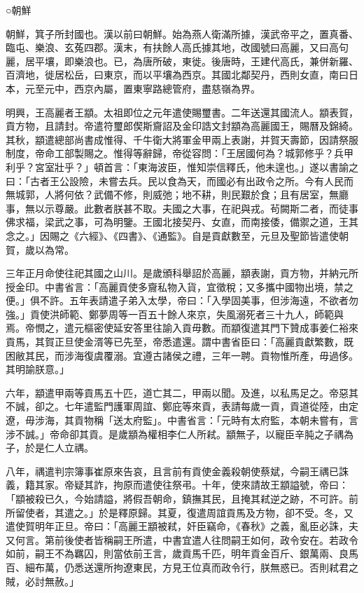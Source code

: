 
\begin{pinyinscope}
○朝鮮

朝鮮，箕子所封國也。漢以前曰朝鮮。始為燕人衛滿所據，漢武帝平之，置真番、臨屯、樂浪、玄菟四郡。漢末，有扶餘人高氏據其地，改國號曰高麗，又曰高句麗，居平壤，即樂浪也。已，為唐所破，東徙。後唐時，王建代高氏，兼併新羅、百濟地，徙居松岳，曰東京，而以平壤為西京。其國北鄰契丹，西則女直，南曰日本，元至元中，西京內屬，置東寧路總管府，盡慈嶺為界。

明興，王高麗者王顓。太祖即位之元年遣使賜璽書。二年送還其國流人。顓表賀，貢方物，且請封。帝遣符璽郎偰斯齎詔及金印誥文封顓為高麗國王，賜曆及錦綺。其秋，顓遣總部尚書成惟得、千牛衛大將軍金甲兩上表謝，并賀天壽節，因請祭服制度，帝命工部製賜之。惟得等辭歸，帝從容問：「王居國何為？城郭修乎？兵甲利乎？宮室壯乎？」頓首言：「東海波臣，惟知崇信釋氏，他未遑也。」遂以書諭之曰：「古者王公設險，未嘗去兵。民以食為天，而國必有出政令之所。今有人民而無城郭，人將何依？武備不修，則威弛；地不耕，則民艱於食；且有居室，無廳事，無以示尊嚴。此數者朕甚不取。夫國之大事，在祀與戎。茍闕斯二者，而徒事佛求福，梁武之事，可為明鑒。王國北接契丹、女直，而南接倭，備禦之道，王其念之。」因賜之《六經》、《四書》、《通監》。自是貢獻數至，元旦及聖節皆遣使朝賀，歲以為常。

三年正月命使往祀其國之山川。是歲頒科舉詔於高麗，顓表謝，貢方物，并納元所授金印。中書省言：「高麗貢使多齎私物入貨，宜徵稅；又多攜中國物出境，禁之便。」俱不許。五年表請遣子弟入太學，帝曰：「入學固美事，但涉海遠，不欲者勿強。」貢使洪師範、鄭夢周等一百五十餘人來京，失風溺死者三十九人，師範與焉。帝憫之，遣元樞密使延安答里往諭入貢毋數。而顓復遣其門下贊成事姜仁裕來貢馬，其賀正旦使金湑等已先至，帝悉遣還。謂中書省臣曰：「高麗貢獻繁數，既困敝其民，而涉海復虞覆溺。宜遵古諸侯之禮，三年一聘。貢物惟所產，毋過侈。其明諭朕意。」

六年，顓遣甲兩等貢馬五十匹，道亡其二，甲兩以聞。及進，以私馬足之。帝惡其不誠，卻之。七年遣監門護軍周誼、鄭庇等來貢，表請每歲一貢，貢道從陸，由定遼，毋涉海，其貢物稱「送太府監」。中書省言：「元時有太府監，本朝未嘗有，言涉不誠。」帝命卻其貢。是歲顓為權相李仁人所弒。顓無子，以寵臣辛肫之子禑為子，於是仁人立禑。

八年，禑遣判宗簿事崔原來告哀，且言前有貢使金義殺朝使蔡斌，今嗣王禑已誅義，籍其家。帝疑其詐，拘原而遣使往祭弔。十年，使來請故王顓謚號，帝曰：「顓被殺已久，今始請謚，將假吾朝命，鎮撫其民，且掩其弒逆之跡，不可許。前所留使者，其遣之。」於是釋原歸。其夏，復遣周誼貢馬及方物，卻不受。冬，又遣使賀明年正旦。帝曰：「高麗王顓被弒，奸臣竊命，《春秋》之義，亂臣必誅，夫又何言。第前後使者皆稱嗣王所遣，中書宜遣人往問嗣王如何，政令安在。若政令如前，嗣王不為羈囚，則當依前王言，歲貢馬千匹，明年貢金百斤、銀萬兩、良馬百、細布萬，仍悉送還所拘遼東民，方見王位真而政令行，朕無惑已。否則弒君之賊，必討無赦。」


\end{pinyinscope}
